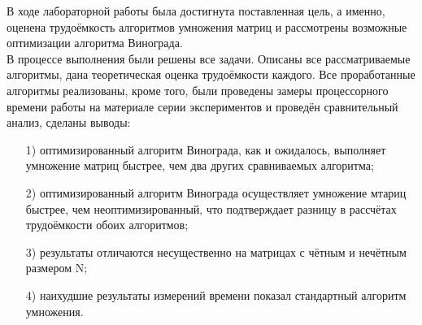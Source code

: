 В ходе лабораторной работы была достигнута поставленная цель, а именно, оценена трудоёмкость алгоритмов умножения матриц и рассмотрены возможные оптимизации алгоритма Винограда.  \\

В процессе выполнения были решены все задачи. Описаны все рассматриваемые алгоритмы, дана теоретическая оценка трудоёмкости каждого. Все проработанные алгоритмы реализованы, кроме того, были проведены замеры процессорного времени работы на материале серии экспериментов и проведён сравнительный анализ, сделаны выводы:
\begin{itemize}
	\item[1)]оптимизированный алгоритм Винограда, как и ожидалось, выполняет умножение матриц быстрее, чем два других сравниваемых алгоритма;
	\item[2)]оптимизированный алгоритм Винограда осуществляет умножение мтариц быстрее, чем неоптимизированный, что подтверждает разницу в рассчётах трудоёмкости обоих алгоритмов;
	\item[3)]результаты отличаются несущественно на матрицах с чётным и нечётным размером N;
	\item[4)]наихудшие результаты измерений времени показал стандартный алгоритм умножения.
\end{itemize}